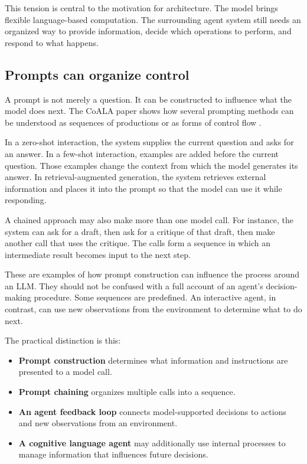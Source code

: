 This tension is central to the motivation for architecture. The model brings flexible language-based computation. The surrounding agent system still needs an organized way to provide information, decide which operations to perform, and respond to what happens.

\subsection{Prompts can organize control}\label{prompts-can-organize-control}

A prompt is not merely a question. It can be constructed to influence what the model does next. The CoALA paper shows how several prompting methods can be understood as sequences of productions or as forms of control flow .

In a zero-shot interaction, the system supplies the current question and asks for an answer. In a few-shot interaction, examples are added before the current question. Those examples change the context from which the model generates its answer. In retrieval-augmented generation, the system retrieves external information and places it into the prompt so that the model can use it while responding.

A chained approach may also make more than one model call. For instance, the system can ask for a draft, then ask for a critique of that draft, then make another call that uses the critique. The calls form a sequence in which an intermediate result becomes input to the next step.

These are examples of how prompt construction can influence the process around an LLM. They should not be confused with a full account of an agent's decision-making procedure. Some sequences are predefined. An interactive agent, in contrast, can use new observations from the environment to determine what to do next.

The practical distinction is this:

\begin{itemize}
\tightlist
\item
  \textbf{Prompt construction} determines what information and instructions are presented to a model call.
\item
  \textbf{Prompt chaining} organizes multiple calls into a sequence.
\item
  \textbf{An agent feedback loop} connects model-supported decisions to actions and new observations from an environment.
\item
  \textbf{A cognitive language agent} may additionally use internal processes to manage information that influences future decisions.
\end{itemize}

